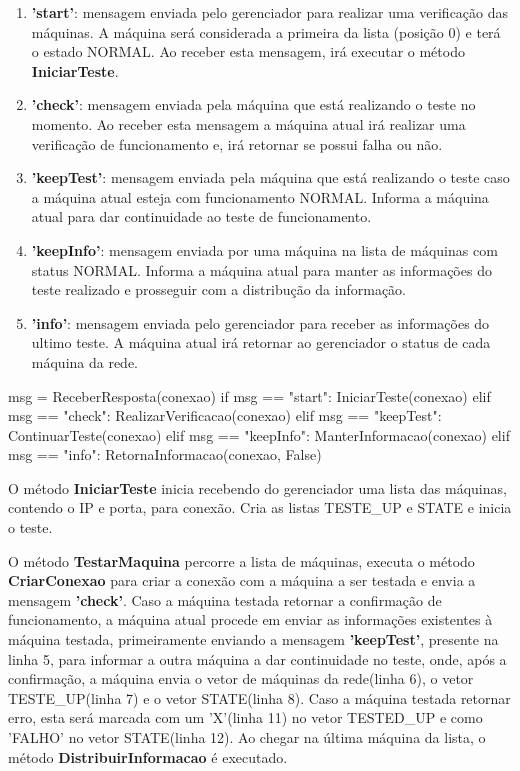 \vspace*{1cm}
\begin{enumerate}
    \item \textbf{'start'}: mensagem enviada pelo gerenciador para realizar uma verificação das máquinas. A máquina será considerada a primeira da lista (posição 0) e terá o estado NORMAL. Ao receber esta mensagem,
    irá executar o método \textbf{IniciarTeste}.
    \item \textbf{'check'}: mensagem enviada pela máquina que está realizando o teste no momento. Ao receber esta mensagem a máquina atual irá realizar uma verificação de funcionamento e, 
    irá retornar se possui falha ou não.
    \item \textbf{'keepTest'}: mensagem enviada pela máquina que está realizando o teste caso a máquina atual esteja com funcionamento NORMAL. Informa a máquina atual para dar continuidade ao teste de funcionamento.
    \item \textbf{'keepInfo'}: mensagem enviada por uma máquina na lista de máquinas com status NORMAL. Informa a máquina atual para manter as informações do teste realizado e prosseguir com a distribução da informação.
    \item \textbf{'info'}: mensagem enviada pelo gerenciador para receber as informações do ultimo teste. A máquina atual irá retornar ao gerenciador o status de cada máquina da rede.
  \end{enumerate}

\vspace*{1cm}
\begin{python}
    msg = ReceberResposta(conexao)
    if msg == "start":
        IniciarTeste(conexao)
    elif msg == "check":
        RealizarVerificacao(conexao)
    elif msg == "keepTest":
        ContinuarTeste(conexao)
    elif msg == "keepInfo":
        ManterInformacao(conexao)
    elif msg == "info":
        RetornaInformacao(conexao, False)
\end{python}
\vspace*{1cm}

O método \textbf{IniciarTeste} inicia recebendo do gerenciador uma lista das máquinas, contendo o IP e porta, para conexão. Cria as listas TESTE\_UP e STATE e inicia o teste.

O método \textbf{TestarMaquina} percorre a lista de máquinas, executa o método \textbf{CriarConexao} para criar a conexão com a máquina a ser testada e envia a mensagem \textbf{'check'}. Caso 
a máquina testada retornar a confirmação de funcionamento, a máquina atual procede em enviar as informações existentes à máquina testada, primeiramente enviando a mensagem \textbf{'keepTest'}, presente na linha 5, 
para informar a outra máquina a dar continuidade no teste, onde, após a confirmação, a máquina envia o vetor de máquinas da rede(linha 6), o vetor TESTE\_UP(linha 7) e o vetor STATE(linha 8).
Caso a máquina testada retornar erro, esta será marcada com um 'X'(linha 11) no vetor TESTED\_UP e como 'FALHO' no vetor STATE(linha 12).
Ao chegar na última máquina da lista, o método \textbf{DistribuirInformacao} é executado.

